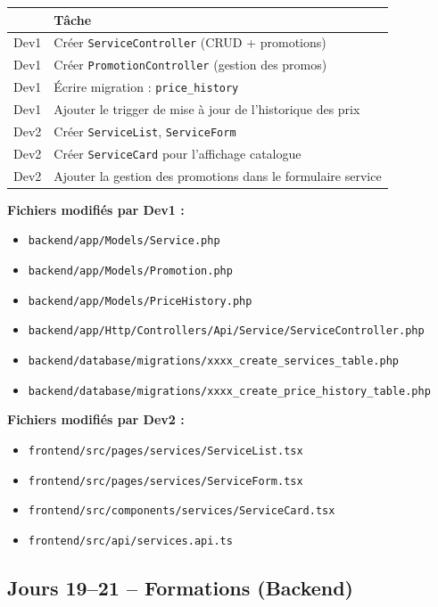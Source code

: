 \documentclass[12pt,a4paper]{report}
\begin{document}
\begin{tabularx}{\textwidth}{l X}
    \toprule
    & \textbf{Tâche} \\
    \midrule
    Dev1 & Créer \texttt{ServiceController} (CRUD + promotions) \\
    Dev1 & Créer \texttt{PromotionController} (gestion des promos) \\
    Dev1 & Écrire migration : \texttt{price\_history} \\
    Dev1 & Ajouter le trigger de mise à jour de l'historique des prix \\
    Dev2 & Créer \texttt{ServiceList}, \texttt{ServiceForm} \\
    Dev2 & Créer \texttt{ServiceCard} pour l'affichage catalogue \\
    Dev2 & Ajouter la gestion des promotions dans le formulaire service \\
    \bottomrule
\end{tabularx}

\textbf{Fichiers modifiés par Dev1 :}
\begin{itemize}
    \item \texttt{backend/app/Models/Service.php}
    \item \texttt{backend/app/Models/Promotion.php}
    \item \texttt{backend/app/Models/PriceHistory.php}
    \item \texttt{backend/app/Http/Controllers/Api/Service/ServiceController.php}
    \item \texttt{backend/database/migrations/xxxx\_create\_services\_table.php}
    \item \texttt{backend/database/migrations/xxxx\_create\_price\_history\_table.php}
\end{itemize}

\textbf{Fichiers modifiés par Dev2 :}
\begin{itemize}
    \item \texttt{frontend/src/pages/services/ServiceList.tsx}
    \item \texttt{frontend/src/pages/services/ServiceForm.tsx}
    \item \texttt{frontend/src/components/services/ServiceCard.tsx}
    \item \texttt{frontend/src/api/services.api.ts}
\end{itemize}

\subsection*{Jours 19--21 -- Formations (Backend)}
\end{document}
